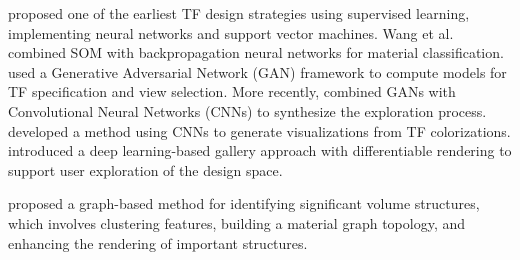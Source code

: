 \cite{tzeng2005} proposed one of the earliest TF design strategies using supervised learning, implementing neural networks and support vector machines. Wang et al.~\cite{wang2006} combined SOM with backpropagation neural networks for material classification. \cite{berger2018} used a Generative Adversarial Network (GAN) framework to compute models for TF specification and view selection. More recently, \cite{hong2019} combined GANs with Convolutional Neural Networks (CNNs) to synthesize the exploration process. \cite{kim2021} developed a method using CNNs to generate visualizations from TF colorizations. \cite{pan2024} introduced a deep learning-based gallery approach with differentiable rendering to support user exploration of the design space.

\cite{sharma2020} proposed a graph-based method for identifying significant volume structures, which involves clustering features, building a material graph topology, and enhancing the rendering of important structures.
